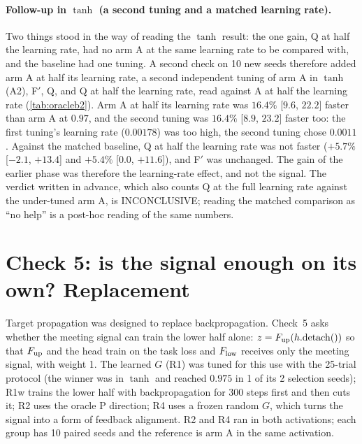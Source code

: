 \paragraph{Follow-up in $\tanh$ (a second tuning and a matched learning rate).} Two things stood in the way of reading the $\tanh$ result: the one gain, Q at half the learning rate, had no arm A at the same learning rate to be compared with, and the baseline had one tuning. A second check on 10 new seeds therefore added arm A at half its learning rate, a second independent tuning of arm A in $\tanh$ (A2), F$'$, Q, and Q at half the learning rate, read against A at half the learning rate (\cref{tab:oracleb2}). Arm A at half its learning rate was $16.4\%$ [$9.6$, $22.2$] faster than arm A at $0.97$, and the second tuning was $16.4\%$ [$8.9$, $23.2$] faster too: the first tuning's learning rate ($0.00178$) was too high, the second tuning chose $0.0011$. Against the matched baseline, Q at half the learning rate was not faster ($+5.7\%$ [$-2.1$, $+13.4$] and $+5.4\%$ [$0.0$, $+11.6$]), and F$'$ was unchanged. The gain of the earlier phase was therefore the learning-rate effect, and not the signal. The verdict written in advance, which also counts Q at the full learning rate against the under-tuned arm A, is INCONCLUSIVE; reading the matched comparison as ``no help'' is a post-hoc reading of the same numbers.

\begin{table}[t]
\centering\small
\caption{Check 4 follow-up in $\tanh$: change in steps to target (percent, $95\%$ paired bootstrap, 10 new seeds; all groups reached both targets on 10 of 10 seeds). Negative is faster.}
\label{tab:oracleb2}
\end{table}

\section{Check 5: is the signal enough on its own? Replacement}\label{sec:replace}
Target propagation was designed to replace backpropagation. Check~5 asks whether the meeting signal can train the lower half alone: $z=F_{\mathrm{up}}(h.\mathrm{detach}())$ so that $F_{\mathrm{up}}$ and the head train on the task loss and $F_{\mathrm{low}}$ receives only the meeting signal, with weight 1. The learned $G$ (R1) was tuned for this use with the 25-trial protocol (the winner was in $\tanh$ and reached $0.975$ in 1 of its 2 selection seeds); R1w trains the lower half with backpropagation for 300 steps first and then cuts it; R2 uses the oracle P direction; R4 uses a frozen random $G$, which turns the signal into a form of feedback alignment. R2 and R4 ran in both activations; each group has 10 paired seeds and the reference is arm A in the same activation.

